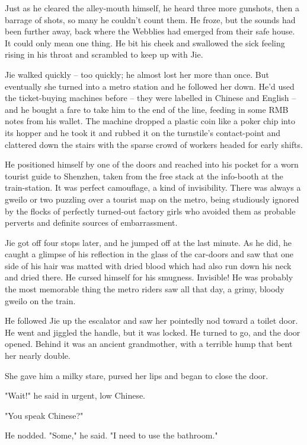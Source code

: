 Just as he cleared the alley-mouth himself, he heard three more
gunshots, then a barrage of shots, so many he couldn't count them.
He froze, but the sounds had been further away, back where the
Webblies had emerged from their safe house. It could only mean one
thing. He bit his cheek and swallowed the sick feeling rising in
his throat and scrambled to keep up with Jie.

Jie walked quickly -- too quickly; he almost lost her more than
once. But eventually she turned into a metro station and he
followed her down. He'd used the ticket-buying machines before --
they were labelled in Chinese and English -- and he bought a fare
to take him to the end of the line, feeding in some RMB notes from
his wallet. The machine dropped a plastic coin like a poker chip
into its hopper and he took it and rubbed it on the turnstile's
contact-point and clattered down the stairs with the sparse crowd
of workers headed for early shifts.

He positioned himself by one of the doors and reached into his
pocket for a worn tourist guide to Shenzhen, taken from the free
stack at the info-booth at the train-station. It was perfect
camouflage, a kind of invisibility. There was always a gweilo or
two puzzling over a tourist map on the metro, being studiously
ignored by the flocks of perfectly turned-out factory girls who
avoided them as probable perverts and definite sources of
embarrassment.

Jie got off four stops later, and he jumped off at the last minute.
As he did, he caught a glimpse of his reflection in the glass of
the car-doors and saw that one side of his hair was matted with
dried blood which had also run down his neck and dried there. He
cursed himself for his smugness. Invisible! He was probably the
most memorable thing the metro riders saw all that day, a grimy,
bloody gweilo on the train.

He followed Jie up the escalator and saw her pointedly nod toward a
toilet door. He went and jiggled the handle, but it was locked. He
turned to go, and the door opened. Behind it was an ancient
grandmother, with a terrible hump that bent her nearly double.

She gave him a milky stare, pursed her lips and began to close the
door.

"Wait!" he said in urgent, low Chinese.

"You speak Chinese?"

He nodded. "Some," he said. "I need to use the bathroom."

